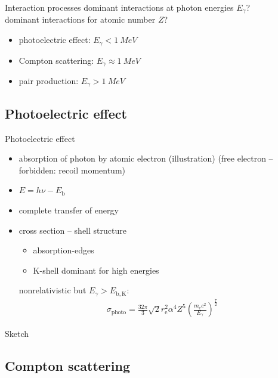 \documentclass[11pt,xcolor=dvipsnames,professionalfonts,notes]{beamer}
\begin{document}
\begin{frame}{Interaction processes}
	dominant interactions at photon energies $E_\gamma$?\\
	dominant interactions for atomic number $Z$?
	\begin{itemize}
		\item photoelectric effect: $E_\gamma < \SI{1}{MeV}$
		\item Compton scattering: $E_\gamma \approx \SI{1}{MeV}$
		\item pair production: $E_\gamma > \SI{1}{MeV}$
	\end{itemize}
\end{frame}

\subsection{Photoelectric effect}

\begin{frame}{Photoelectric effect}
	\begin{itemize}
		\item absorption of photon by atomic electron (illustration) (free electron -- forbidden: recoil momentum)
		\item $E = h \nu - E_\mathrm{b}$
		\item complete transfer of energy
		\item cross section -- shell structure
		\begin{itemize}
			\item absorption-edges
			\item K-shell dominant for high energies
		\end{itemize}
		nonrelativistic but $E_\gamma > E_\mathrm{b, K}$:
		\begin{align*}
			\sigma_\mathrm{photo} = \frac{32 \pi}{3} \sqrt{2} r_\mathrm{e}^2  \alpha^4  Z^5 \left( \frac{m_\mathrm{e} c^2}{E_\gamma}\right)^\frac{7}{2} 
		\end{align*}		
	\end{itemize}
\end{frame}

\begin{frame}{Sketch}

\end{frame}


\subsection{Compton scattering}
\end{document}
